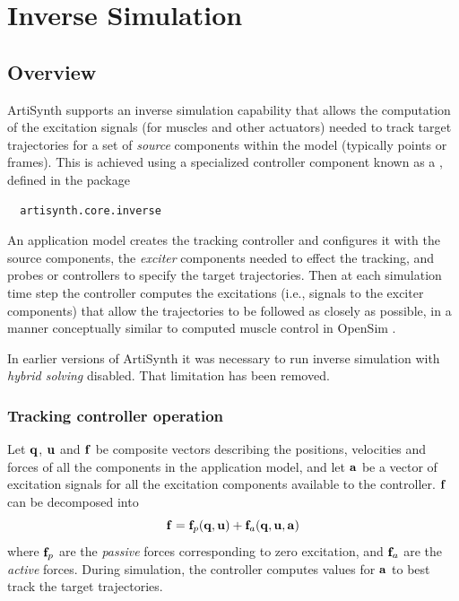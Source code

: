 \ifdefined\maindoc\else
\def\doctitle{Inverse Simulation}

\mainmatter
\fi

\chapter{Inverse Simulation}
\label{InverseSimulation:sec}

\section{Overview}

ArtiSynth supports an inverse simulation capability that allows the computation
of the excitation signals (for muscles and other actuators) needed to track
target trajectories for a set of {\it source} components within the model
(typically points or frames). This is achieved using a specialized controller
component known as a
, defined in the package
%
\begin{verbatim}
  artisynth.core.inverse
\end{verbatim}
%
An application model creates the tracking controller and configures it with the
source components, the {\it exciter} components needed to effect the tracking,
and probes or controllers to specify the target trajectories. Then at each
simulation time step the controller computes the excitations (i.e., signals to
the exciter components) that allow the trajectories to be followed as closely
as possible, in a manner conceptually similar to computed muscle control in
OpenSim \cite{delp2007opensim}.

\begin{sideblock}
In earlier versions of ArtiSynth it was necessary to run inverse
simulation with {\it hybrid solving} disabled. That limitation has
been removed.
\end{sideblock}

\subsection{Tracking controller operation}

Let ${\bf q}$, ${\bf u}$ and ${\bf f}$ be composite vectors describing the positions,
velocities and forces of all the components in the application model, and let
${\bf a}$ be a vector of excitation signals for all the excitation components
available to the controller. ${\bf f}$ can be decomposed into
%
\begin{equation}
{\bf f} = {\bf f}_p ({\bf q}, {\bf u}) + {\bf f}_a ({\bf q}, {\bf u}, {\bf a})
\label{fnonlinear:eqn}	
\end{equation}
%
where ${\bf f}_p$ are the {\it passive} forces corresponding to zero excitation, and
${\bf f}_a$ are the {\it active} forces. During simulation, the controller computes
values for ${\bf a}$ to best track the target trajectories.


